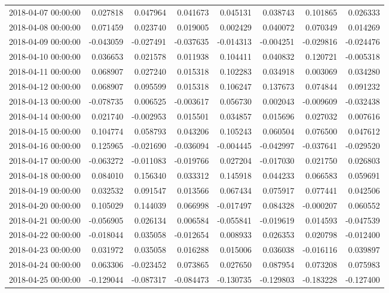 \begin{tabular}{lrrrrrrr}
2018-04-07 00:00:00 & 0.027818 & 0.047964 & 0.041673 & 0.045131 & 0.038743 & 0.101865 & 0.026333 \\
2018-04-08 00:00:00 & 0.071459 & 0.023740 & 0.019005 & 0.002429 & 0.040072 & 0.070349 & 0.014269 \\
2018-04-09 00:00:00 & -0.043059 & -0.027491 & -0.037635 & -0.014313 & -0.004251 & -0.029816 & -0.024476 \\
2018-04-10 00:00:00 & 0.036653 & 0.021578 & 0.011938 & 0.104411 & 0.040832 & 0.120721 & -0.005318 \\
2018-04-11 00:00:00 & 0.068907 & 0.027240 & 0.015318 & 0.102283 & 0.034918 & 0.003069 & 0.034280 \\
2018-04-12 00:00:00 & 0.068907 & 0.095599 & 0.015318 & 0.106247 & 0.137673 & 0.074844 & 0.091232 \\
2018-04-13 00:00:00 & -0.078735 & 0.006525 & -0.003617 & 0.056730 & 0.002043 & -0.009609 & -0.032438 \\
2018-04-14 00:00:00 & 0.021740 & -0.002953 & 0.015501 & 0.034857 & 0.015696 & 0.027032 & 0.007616 \\
2018-04-15 00:00:00 & 0.104774 & 0.058793 & 0.043206 & 0.105243 & 0.060504 & 0.076500 & 0.047612 \\
2018-04-16 00:00:00 & 0.125965 & -0.021690 & -0.036094 & -0.004445 & -0.042997 & -0.037641 & -0.029520 \\
2018-04-17 00:00:00 & -0.063272 & -0.011083 & -0.019766 & 0.027204 & -0.017030 & 0.021750 & 0.026803 \\
2018-04-18 00:00:00 & 0.084010 & 0.156340 & 0.033312 & 0.145918 & 0.044233 & 0.066583 & 0.059691 \\
2018-04-19 00:00:00 & 0.032532 & 0.091547 & 0.013566 & 0.067434 & 0.075917 & 0.077441 & 0.042506 \\
2018-04-20 00:00:00 & 0.105029 & 0.144039 & 0.066998 & -0.017497 & 0.084328 & -0.000207 & 0.060552 \\
2018-04-21 00:00:00 & -0.056905 & 0.026134 & 0.006584 & -0.055841 & -0.019619 & 0.014593 & -0.047539 \\
2018-04-22 00:00:00 & -0.018044 & 0.035058 & -0.012654 & 0.008933 & 0.026353 & 0.020798 & -0.012400 \\
2018-04-23 00:00:00 & 0.031972 & 0.035058 & 0.016288 & 0.015006 & 0.036038 & -0.016116 & 0.039897 \\
2018-04-24 00:00:00 & 0.063306 & -0.023452 & 0.073865 & 0.027650 & 0.087954 & 0.073208 & 0.075983 \\
2018-04-25 00:00:00 & -0.129044 & -0.087317 & -0.084473 & -0.130735 & -0.129803 & -0.183228 & -0.127400 \\

\end{tabular}
